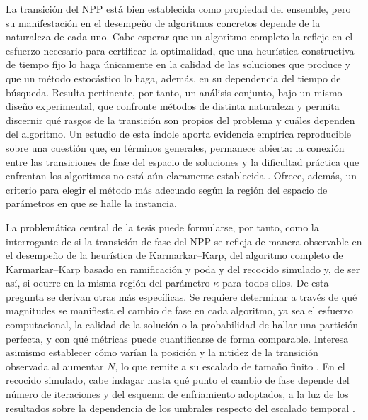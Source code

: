 La transición del NPP está bien establecida como propiedad del ensemble, pero su manifestación en el desempeño de algoritmos concretos depende de la naturaleza de cada uno. Cabe esperar que un algoritmo completo la refleje en el esfuerzo necesario para certificar la optimalidad, que una heurística constructiva de tiempo fijo lo haga únicamente en la calidad de las soluciones que produce y que un método estocástico lo haga, además, en su dependencia del tiempo de búsqueda. Resulta pertinente, por tanto, un análisis conjunto, bajo un mismo diseño experimental, que confronte métodos de distinta naturaleza y permita discernir qué rasgos de la transición son propios del problema y cuáles dependen del algoritmo. Un estudio de esta índole aporta evidencia empírica reproducible sobre una cuestión que, en términos generales, permanece abierta: la conexión entre las transiciones de fase del espacio de soluciones y la dificultad práctica que enfrentan los algoritmos no está aún claramente establecida \parencite{angelini2026}. Ofrece, además, un criterio para elegir el método más adecuado según la región del espacio de parámetros en que se halle la instancia.

La problemática central de la tesis puede formularse, por tanto, como la interrogante de si la transición de fase del NPP se refleja de manera observable en el desempeño de la heurística de Karmarkar--Karp, del algoritmo completo de Karmarkar--Karp basado en ramificación y poda y del recocido simulado y, de ser así, si ocurre en la misma región del parámetro $\kappa$ para todos ellos. De esta pregunta se derivan otras más específicas. Se requiere determinar a través de qué magnitudes se manifiesta el cambio de fase en cada algoritmo, ya sea el esfuerzo computacional, la calidad de la solución o la probabilidad de hallar una partición perfecta, y con qué métricas puede cuantificarse de forma comparable. Interesa asimismo establecer cómo varían la posición y la nitidez de la transición observada al aumentar $N$, lo que remite a su escalado de tamaño finito \parencite{borgs2001,gent1998}. En el recocido simulado, cabe indagar hasta qué punto el cambio de fase depende del número de iteraciones y del esquema de enfriamiento adoptados, a la luz de los resultados sobre la dependencia de los umbrales respecto del escalado temporal \parencite{angelini2026}.

